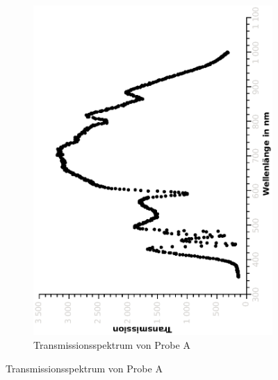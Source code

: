 \documentclass{article}
\begin{document}
\begin{figure}[H]
\begin{subfigure}[h]{0.4\textwidth}
\includegraphics[width=\textwidth ,angle=-90]{eps/probeAtrans.eps}
\caption{Transmissionsspektrum von Probe A}
\end{subfigure}
\end{figure}
\end{document}
